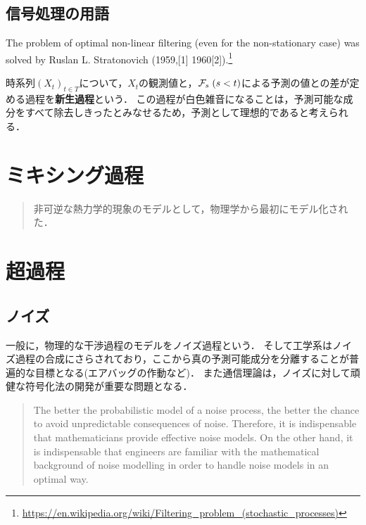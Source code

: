 \documentclass[uplatex,dvipdfmx]{jsreport}
\begin{document}
\section{信号処理の用語}

\begin{tcolorbox}[colframe=ForestGreen, colback=ForestGreen!10!white,breakable,colbacktitle=ForestGreen!40!white,coltitle=black,fonttitle=\bfseries\sffamily,
title=]
The problem of optimal non-linear filtering (even for the non-stationary case) was solved by Ruslan L. Stratonovich (1959,[1] 1960[2]).\footnote{\url{https://en.wikipedia.org/wiki/Filtering_problem_(stochastic_processes)}}
\end{tcolorbox}

\begin{definition}
    
\end{definition}

\begin{definition}[innovation]
    時系列$(X_t)_{t\in T}$について，$X_t$の観測値と，$\mathcal{F}_s\;(s<t)$による予測の値との差が定める過程を\textbf{新生過程}という．
    この過程が白色雑音になることは，予測可能な成分をすべて除去しきったとみなせるため，予測として理想的であると考えられる．
\end{definition}

\chapter{ミキシング過程}

\begin{quotation}
    非可逆な熱力学的現象のモデルとして，物理学から最初にモデル化された．
\end{quotation}

\chapter{超過程}

\section{ノイズ}

一般に，物理的な干渉過程のモデルをノイズ過程という．
そして工学系はノイズ過程の合成にさらされており，ここから真の予測可能成分を分離することが普遍的な目標となる(エアバッグの作動など)．
また通信理論は，ノイズに対して頑健な符号化法の開発が重要な問題となる．
\begin{quote}
    The
better the probabilistic model of a noise process, the better the chance to
avoid unpredictable consequences of noise. Therefore, it is indispensable
that mathematicians provide effective noise models. On the other hand, it is
indispensable that engineers are familiar with the mathematical background
of noise modelling in order to handle noise models in an optimal way.\cite{Schaffler}
\end{quote}
\end{document}

